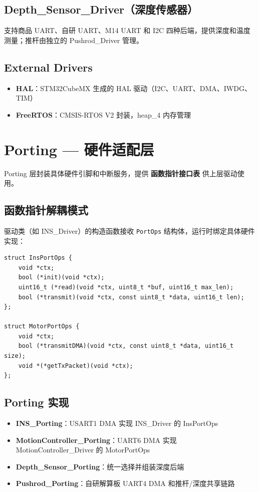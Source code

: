 \documentclass[12pt,a4paper]{article}
\begin{document}
\subsection{Depth\_Sensor\_Driver（深度传感器）}

支持商品 UART、自研 UART、M14 UART 和 I2C 四种后端，提供深度和温度测量；推杆由独立的 Pushrod\_Driver 管理。

\subsection{External Drivers}
\begin{itemize}
    \item \textbf{HAL}：STM32CubeMX 生成的 HAL 驱动（I2C、UART、DMA、IWDG、TIM）
    \item \textbf{FreeRTOS}：CMSIS-RTOS V2 封装，heap\_4 内存管理
\end{itemize}

\section{Porting — 硬件适配层}

Porting 层封装具体硬件引脚和中断服务，提供 \textbf{函数指针接口表} 供上层驱动使用。

\subsection{函数指针解耦模式}

驱动类（如 INS\_Driver）的构造函数接收 \texttt{PortOps} 结构体，运行时绑定具体硬件实现：

\begin{lstlisting}[caption={PortOps 接口模式示例}]
struct InsPortOps {
    void *ctx;
    bool (*init)(void *ctx);
    uint16_t (*read)(void *ctx, uint8_t *buf, uint16_t max_len);
    bool (*transmit)(void *ctx, const uint8_t *data, uint16_t len);
};

struct MotorPortOps {
    void *ctx;
    bool (*transmitDMA)(void *ctx, const uint8_t *data, uint16_t size);
    void *(*getTxPacket)(void *ctx);
};
\end{lstlisting}

\subsection{Porting 实现}

\begin{itemize}
    \item \textbf{INS\_Porting}：USART1 DMA 实现 INS\_Driver 的 InsPortOps
    \item \textbf{MotionController\_Porting}：UART6 DMA 实现 MotionController\_Driver 的 MotorPortOps
    \item \textbf{Depth\_Sensor\_Porting}：统一选择并组装深度后端
    \item \textbf{Pushrod\_Porting}：自研解算板 UART4 DMA 和推杆/深度共享链路
\end{itemize}
\end{document}
